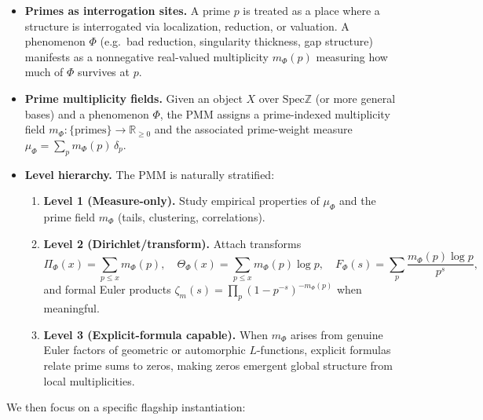 \documentclass[11pt]{article}
\theoremstyle{definition}
\theoremstyle{plain}
\theoremstyle{remark}
\newcommand{\Spec}{\mathrm{Spec}}
\newcommand{\ZZ}{\mathbb{Z}}
\newcommand{\RR}{\mathbb{R}}
\newcommand{\1}{\mathbb{1}}
\begin{document}
\begin{itemize}[leftmargin=*]
  \item \textbf{Primes as interrogation sites.} A prime \(p\) is treated as a place where a structure is interrogated via localization, reduction, or valuation. A phenomenon \(\Phi\) (e.g.\ bad reduction, singularity thickness, gap structure) manifests as a nonnegative real-valued multiplicity \(m_\Phi(p)\) measuring how much of \(\Phi\) survives at \(p\).
  \item \textbf{Prime multiplicity fields.} Given an object \(X\) over \(\Spec \ZZ\) (or more general bases) and a phenomenon \(\Phi\), the PMM assigns a prime-indexed multiplicity field \(m_\Phi: \{\text{primes}\} \to \RR_{\ge 0}\) and the associated prime-weight measure \(\mu_\Phi = \sum_p m_\Phi(p)\,\delta_p\).
  \item \textbf{Level hierarchy.} The PMM is naturally stratified:
  \begin{enumerate}[label=(L\arabic*),leftmargin=*]
    \item \textbf{Level 1 (Measure-only).} Study empirical properties of \(\mu_\Phi\) and the prime field \(m_\Phi\) (tails, clustering, correlations).
    \item \textbf{Level 2 (Dirichlet/transform).} Attach transforms
      \[
        \Pi_\Phi(x) = \sum_{p\le x} m_\Phi(p),\quad
        \Theta_\Phi(x) = \sum_{p\le x} m_\Phi(p)\log p,\quad
        F_\Phi(s) = \sum_p \frac{m_\Phi(p)\log p}{p^s},
      \]
      and formal Euler products \(\zeta_m(s)=\prod_p (1-p^{-s})^{-m_\Phi(p)}\) when meaningful.
    \item \textbf{Level 3 (Explicit-formula capable).} When \(m_\Phi\) arises from genuine Euler factors of geometric or automorphic \(L\)-functions, explicit formulas relate prime sums to zeros, making zeros emergent global structure from local multiplicities.
  \end{enumerate}
\end{itemize}

We then focus on a specific flagship instantiation:
\end{document}
